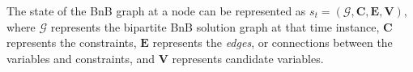 The state of the \gls{BnB} graph at a node can be represented as $s_t = (\mathcal{G}, \mathbf{C}, \mathbf{E}, \mathbf{V})$, where $\mathcal{G}$ represents the bipartite \gls{BnB} solution graph at that time instance, $\mathbf{C}$ represents the constraints, $\mathbf{E}$ represents the \textit{edges}, or connections between the variables and constraints, and $\mathbf{V}$ represents candidate variables.  